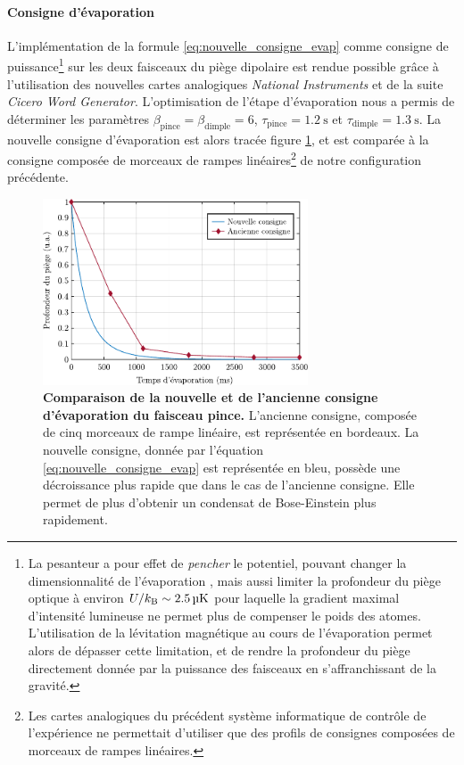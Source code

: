 \paragraph*{Consigne d'évaporation}
L'implémentation de la formule \ref{eq:nouvelle_consigne_evap} comme consigne de puissance\footnote{La pesanteur a pour effet de \textit{pencher} le potentiel, pouvant changer la dimensionnalité de l'évaporation \citep{boyer2000condensation}, mais aussi limiter la profondeur du piège optique à environ $U/k_{\mathrm{B}} \sim \SI{2.5}{\micro\kelvin}$ pour laquelle la gradient maximal d'intensité lumineuse ne permet plus de compenser le poids des atomes. L'utilisation de la lévitation magnétique au cours de l'évaporation permet alors de dépasser cette limitation, et de rendre la profondeur du piège directement donnée par la puissance des faisceaux en s'affranchissant de la gravité. } sur les deux faisceaux du piège dipolaire est rendue possible grâce à l'utilisation des nouvelles cartes analogiques \emph{National Instruments} et de la suite \emph{Cicero Word Generator}.
L'optimisation de l'étape d'évaporation nous a permis de déterminer les paramètres $\beta_{\mathrm{pince}}=\beta_{\mathrm{dimple}}=6$, $\tau_{\mathrm{pince}}=\SI{1.2}{\second}$ et $\tau_{\mathrm{dimple}}=\SI{1.3}{\second}$. La nouvelle consigne d'évaporation est alors tracée figure \ref{fig:comparaison_consigne_evap}, et est comparée à la consigne composée de morceaux de rampes linéaires\footnote{Les cartes analogiques du précédent système informatique de contrôle de l'expérience ne permettait d'utiliser que des profils de consignes composées de morceaux de rampes linéaires. } de notre configuration précédente.

\begin{figure}
\centering
\includegraphics[width=0.7\textwidth]{Fig/Modif_exp/comparaison_consignes_evap.pdf}
\caption{\textbf{Comparaison de la nouvelle et de l'ancienne consigne d'évaporation du faisceau pince.} L'ancienne consigne, composée de cinq morceaux de rampe linéaire, est représentée en bordeaux. La nouvelle consigne, donnée par l'équation \ref{eq:nouvelle_consigne_evap} est représentée en bleu, possède une décroissance plus rapide que dans le cas de l'ancienne consigne. Elle permet de plus d'obtenir un condensat de Bose-Einstein plus rapidement.}
\label{fig:comparaison_consigne_evap}
\end{figure}

